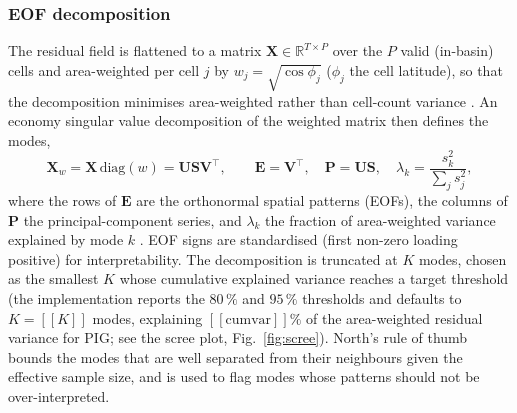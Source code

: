 \subsubsection{EOF decomposition}
The residual field is flattened to a matrix
$\mathbf{X}\in\mathbb{R}^{T\times P}$ over the $P$ valid (in-basin) cells and
area-weighted per cell $j$ by $w_j=\sqrt{\cos\phi_j}$ ($\phi_j$ the cell
latitude), so that the decomposition minimises area-weighted rather than
cell-count variance \citep{north1982,hannachi2007}. An economy singular value
decomposition of the weighted matrix then defines the modes,
\begin{equation}\label{eq:svd}
  \mathbf{X}_w=\mathbf{X}\,\mathrm{diag}(w)
  =\mathbf{U}\mathbf{S}\mathbf{V}^{\top},
  \qquad
  \mathbf{E}=\mathbf{V}^{\top},\quad
  \mathbf{P}=\mathbf{U}\mathbf{S},\quad
  \lambda_k=\frac{s_k^2}{\sum_j s_j^2},
\end{equation}
where the rows of $\mathbf{E}$ are the orthonormal
spatial patterns (EOFs), the columns of $\mathbf{P}$ the principal-component
series, and $\lambda_k$ the fraction of area-weighted variance explained by
mode $k$ \citep{lorenz1956,preisendorfer1988}. EOF
signs are standardised (first non-zero loading positive) for
interpretability. The decomposition is truncated at $K$ modes, chosen as the
smallest $K$ whose cumulative explained variance reaches a target threshold
(the implementation reports the $80\,\%$ and $95\,\%$ thresholds and defaults
to $K=[[K]]$ modes, explaining $[[\text{cumvar}]]\%$ of the area-weighted
residual variance for PIG; see the scree plot, Fig.~\ref{fig:scree}). North's
rule of thumb \citep{north1982} bounds the modes that are well separated from
their neighbours given the effective sample size, and is used to flag modes
whose patterns should not be over-interpreted.

